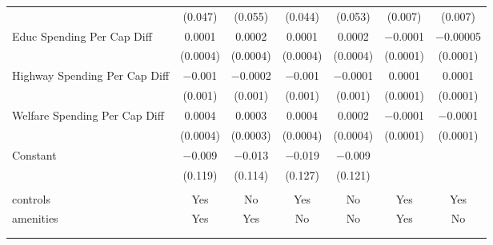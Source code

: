 \begin{table}[!htbp]
\begin{tabular}{@{\extracolsep{5pt}}lcccccc}
  & (0.047) & (0.055) & (0.044) & (0.053) & (0.007) & (0.007) \\ 
  Educ Spending Per Cap Diff & 0.0001 & 0.0002 & 0.0001 & 0.0002 & $-$0.0001 & $-$0.00005 \\ 
  & (0.0004) & (0.0004) & (0.0004) & (0.0004) & (0.0001) & (0.0001) \\ 
  Highway Spending Per Cap Diff & $-$0.001 & $-$0.0002 & $-$0.001 & $-$0.0001 & 0.0001 & 0.0001 \\ 
  & (0.001) & (0.001) & (0.001) & (0.001) & (0.0001) & (0.0001) \\ 
  Welfare Spending Per Cap Diff & 0.0004 & 0.0003 & 0.0004 & 0.0002 & $-$0.0001 & $-$0.0001 \\ 
  & (0.0004) & (0.0003) & (0.0004) & (0.0004) & (0.0001) & (0.0001) \\ 
  Constant & $-$0.009 & $-$0.013 & $-$0.019 & $-$0.009 &  &  \\ 
  & (0.119) & (0.114) & (0.127) & (0.121) &  &  \\ 
 \hline \\[-1.8ex] 
controls & Yes & No & Yes & No & Yes & Yes \\ 
amenities & Yes & Yes & No & No & Yes & No \\ 
\hline \\[-1.8ex] 
\hline 
\hline \\[-1.8ex] 
\end{tabular} 
\end{table} 
